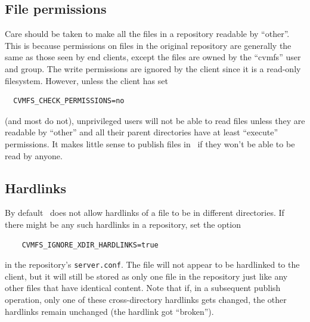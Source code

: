 \subsection{File permissions}
Care should be taken to make all the files in a repository readable by ``other''.
This is because permissions on files in the original repository are generally the same as those seen by end clients, except the files are owned by the ``cvmfs'' user and group.
The write permissions are ignored by the client since it is a read-only filesystem.
However, unless the client has set
\begin{verbatim}
  CVMFS_CHECK_PERMISSIONS=no
\end{verbatim}
(and most do not), unprivileged users will not be able to read files unless they are readable by ``other'' and all their parent directories have at least ``execute'' permissions.
It makes little sense to publish files in \cvmfs\ if they won't be able to be read by anyone.

\subsection{Hardlinks}
By default \cvmfs\ does not allow hardlinks of a file to be in different directories.
If there might be any such hardlinks in a repository, set the option
\begin{verbatim}
    CVMFS_IGNORE_XDIR_HARDLINKS=true
\end{verbatim}
in the repository's \texttt{server.conf}.
The file will not appear to be hardlinked to the client, but it will still be stored as only one file in the repository just like any other files that have identical content.
Note that if, in a subsequent publish operation, only one of these cross-directory hardlinks gets changed, the other hardlinks remain unchanged (the hardlink got ``broken'').
